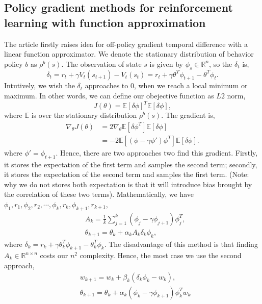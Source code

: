 \documentclass[11pt,a4paper]{article}
\def\E{\mathbb{E}}
\begin{document}
\subsection{ Policy gradient methods for reinforcement learning with function approximation}
The article\cite{NIPS2008_3626} firstly raises idea for off-policy gradient temporal difference with a linear function approximator. We denote the stationary distribution of behavior policy $b$ as $\rho^{b}(s)$. The observation of state $s$ is given by $\phi_s \in \mathbb{R}^n$, so the $\delta_t$ is,
\begin{equation}
\delta_t = r_{t} + \gamma V_t(s_{t+1}) - V_t(s_t) = r_t + \gamma \theta^T\phi_{t+1} -\theta^T \phi_t.
\end{equation}
Intutively, we wish the $\delta_t$ approaches to $0$, when we reach a local minimum or maximum. In other words, we can define our obejective function as $L2$ norm,
\begin{equation}
J(\theta) = \E[\delta \phi]^T \E[\delta \phi],
\end{equation}
where $\E$ is over the stationary distribution $\rho^b(s)$. The gradient is,
\begin{align}
\nabla_{\theta}J(\theta)& = 2 \nabla_{\theta}\E[\delta \phi^T] \E[\delta \phi] \\ 
& = -2\E[(\phi-\gamma\phi')\phi^T]\E[\delta\phi].
\end{align}
where $\phi' = \phi_{t+1}$. Hence, there are two approaches two find this gradient. Firstly, it stores the expectation of the first term and samples the second term; secondly, it stores the expectation of the second term and samples the first term. (Note: why we do not stores both expectation is that it will introduce bias brought by the correlation of these two terms). Mathematically, we have $\phi_1,r_1,\phi_2,r_2,\cdots, \phi_k, r_k,\phi_{k+1},r_{k+1}$,
\begin{align}
& A_k = \frac{1}{k}\sum_{j=1}^k(\phi_j-\gamma\phi_{j+1})\phi_j^T, \\ 
& \theta_{k+1} = \theta_k + \alpha_k A_k \delta_k\phi_k,
\end{align}
where $\delta_k = r_k + \gamma \theta_k^T\phi_{k+1}-\theta_k^T\phi_k$. The disadvantage of this method is that finding $A_k \in \mathbb{R}^{n\times n}$ costs our $n^2$ complexity. Hence, the most case we use the second approach,
\begin{align}
& w_{k+1} = w_k + \beta_k (\delta_k\phi_k - w_k), \\ 
& \theta_{k+1} = \theta_k + \alpha_k(\phi_k-\gamma\phi_{k+1})\phi_k^T w_k
\end{align}
\end{document}
